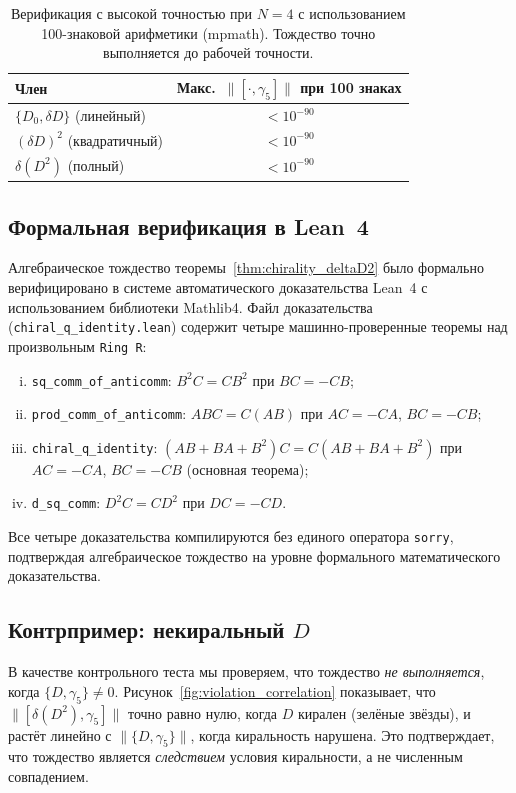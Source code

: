 \documentclass[12pt,a4paper]{article}
\theoremstyle{definition}
\theoremstyle{remark}
\begin{document}
\begin{table}[ht]
\centering
\caption{Верификация с высокой точностью при $N = 4$ с использованием
100-знаковой арифметики (mpmath).  Тождество точно выполняется до
рабочей точности.}\label{tab:mpmath}
\begin{tabular}{@{}lc@{}}
\toprule
Член & Макс.\ $\|[\cdot, \gamma_5]\|$ при 100 знаках \\
\midrule
$\{D_0, \delta D\}$ (линейный) & $< 10^{-90}$ \\
$(\delta D)^2$ (квадратичный)   & $< 10^{-90}$ \\
$\delta(D^2)$ (полный)         & $< 10^{-90}$ \\
\bottomrule
\end{tabular}
\end{table}

\subsection{Формальная верификация в Lean~4}

Алгебраическое тождество теоремы~\ref{thm:chirality_deltaD2} было
формально верифицировано в системе автоматического доказательства
Lean~4 с использованием библиотеки Mathlib4.  Файл доказательства
(\texttt{chiral\_q\_identity.lean}) содержит четыре машинно-проверенные
теоремы над произвольным \texttt{Ring R}:
\begin{enumerate}[(i)]
  \item \texttt{sq\_comm\_of\_anticomm}: $B^2 C = C B^2$ при $BC = -CB$;
  \item \texttt{prod\_comm\_of\_anticomm}: $ABC = C(AB)$ при $AC=-CA$,
        $BC=-CB$;
  \item \texttt{chiral\_q\_identity}: $(AB + BA + B^2)C = C(AB + BA + B^2)$
    при $AC=-CA$, $BC=-CB$ (основная теорема);
  \item \texttt{d\_sq\_comm}: $D^2 C = C D^2$ при $DC = -CD$.
\end{enumerate}
Все четыре доказательства компилируются без единого оператора
\texttt{sorry}, подтверждая алгебраическое тождество на уровне
формального математического доказательства.

\subsection{Контрпример: некиральный $D$}

В качестве контрольного теста мы проверяем, что тождество
\emph{не выполняется}, когда $\{D, \gamma_5\} \neq 0$.
Рисунок~\ref{fig:violation_correlation} показывает, что
$\|[\delta(D^2), \gamma_5]\|$ точно равно нулю, когда $D$ кирален
(зелёные звёзды), и растёт линейно с $\|\{D, \gamma_5\}\|$, когда
киральность нарушена.  Это подтверждает, что тождество является
\emph{следствием} условия киральности, а не численным совпадением.
\end{document}
